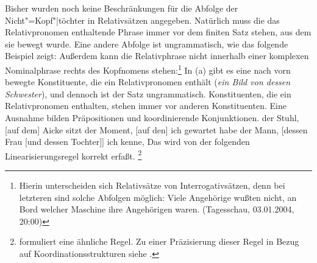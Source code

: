 
Bisher wurden noch keine Beschränkungen
für die Abfolge der Nicht"=Kopf"|töchter in Relativsätzen angegeben. Natürlich muss die das
Relativpronomen enthaltende Phrase immer vor dem finiten Satz stehen, aus dem sie bewegt wurde. Eine
andere Abfolge ist ungrammatisch, wie das folgende Beispiel zeigt:
\z
Außerdem kann die Relativphrase nicht innerhalb einer komplexen
Nominalphrase rechts des Kopfnomens stehen:\footnote{
  Hierin unterscheiden sich Relativsätze von Interrogativsätzen,
  denn bei letzteren sind solche Abfolgen möglich:
\ea
Viele Angehörige wußten nicht, an Bord welcher Maschine ihre Angehörigen waren.
  (Tagesschau, 03.01.2004, 20:00)
\zlast
}
\eal
{}
\zl
In (a) gibt es eine nach vorn bewegte Konstituente, die ein Relativpronomen enthält 
(\emph{ein Bild von dessen Schwester}), und dennoch ist der Satz ungrammatisch.
Konstituenten, die ein Relativpronomen enthalten, stehen immer vor anderen Konstituenten.
Eine Ausnahme bilden Präpositionen 
und koordinierende Konjunktionen.
\eal
\ex der Stuhl, [auf dem] Aicke sitzt
\ex der Moment, [auf den] ich gewartet habe
\zl
\ea
der Mann, [dessen Frau [und dessen Tochter]] ich kenne,
\z
Das wird von der folgenden Linearisierungsregel korrekt erfaßt.
\footnote{
        \citet*{Riemsdijk85} 
        formuliert eine ähnliche Regel. Zu einer Präzisierung dieser
        Regel in Bezug auf Koordinationsstrukturen siehe .%
}

